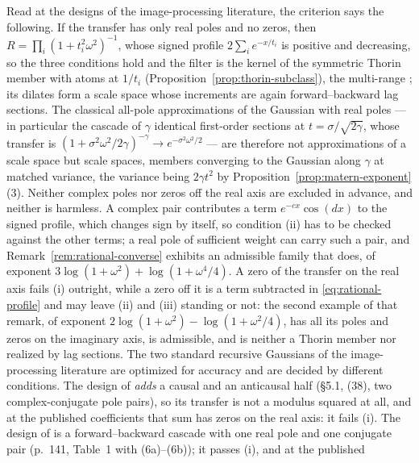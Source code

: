 \begin{remark}
\label{rem:recursive-gaussians}
Read at the designs of the image-processing literature, the criterion says the following. If the
transfer has only real poles and no zeros, then $R = \prod_i(1+t_i^2\omega^2)^{-1}$, whose signed
profile $2\sum_ie^{-x/t_i}$ is positive and decreasing, so the three conditions hold and the
filter is the kernel of the symmetric Thorin member with atoms at $1/t_i$
(Proposition~\ref{prop:thorin-subclass}), the multi-range \Matern{}; its dilates form a scale
space whose increments are again forward--backward lag sections. The classical all-pole
approximations of the Gaussian with real poles --- in particular the cascade of $\gamma$
identical first-order sections at $t = \sigma/\sqrt{2\gamma}$, whose transfer is
$(1+\sigma^2\omega^2/2\gamma)^{-\gamma} \to e^{-\sigma^2\omega^2/2}$ --- are therefore not
approximations of a scale space but scale spaces, \Matern{} members converging to the Gaussian
along $\gamma$ at matched variance, the variance being $2\gamma t^2$ by
Proposition~\ref{prop:matern-exponent}(3). Neither complex poles nor zeros off the real axis are
excluded in advance, and neither is harmless. A complex pair contributes a term
$e^{-cx}\cos(dx)$ to the signed profile, which changes sign by itself, so condition (ii) has to
be checked against the other terms; a real pole of sufficient weight can carry such a pair, and
Remark~\ref{rem:rational-converse} exhibits an admissible family that does, of exponent
$3\log(1+\omega^2) + \log(1+\omega^4/4)$. A zero of the transfer on the real axis fails (i)
outright, while a zero off it is a term subtracted in \ref{eq:rational-profile} and may leave
(ii) and (iii) standing or not: the second example of that remark, of exponent
$2\log(1+\omega^2) - \log(1+\omega^2/4)$, has all its poles and zeros on the imaginary axis, is
admissible, and is neither a Thorin member nor realized by lag sections. The two standard
recursive Gaussians of the image-processing literature are optimized for accuracy and are decided
by different conditions. The design of  \emph{adds} a causal and an
anticausal half (\S5.1, (38), two complex-conjugate pole pairs), so its transfer is not a modulus
squared at all, and at the published coefficients that sum has zeros on the real axis: it fails
(i). The design of  is a forward--backward cascade with one real pole
and one conjugate pair (p.~141, Table~1 with (6a)--(6b)); it passes (i), and at the published

\end{remark}
